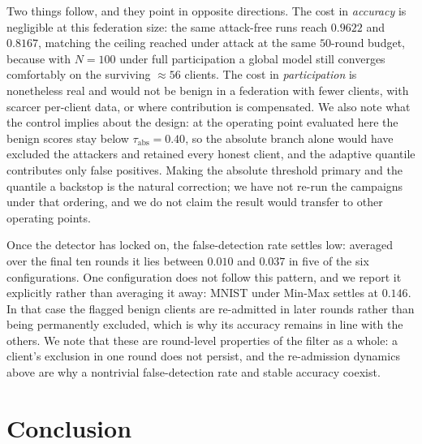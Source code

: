 \documentclass[journal]{IEEEtran}
\begin{document}
Two things follow, and they point in opposite directions. The cost in \emph{accuracy} is negligible at this federation size: the same attack-free runs reach $0.9622$ and $0.8167$, matching the ceiling reached under attack at the same $50$-round budget, because with $N = 100$ under full participation a global model still converges comfortably on the surviving $\approx56$ clients. The cost in \emph{participation} is nonetheless real and would not be benign in a federation with fewer clients, with scarcer per-client data, or where contribution is compensated. We also note what the control implies about the design: at the operating point evaluated here the benign scores stay below $\tau_{\mathrm{abs}} = 0.40$, so the absolute branch alone would have excluded the attackers and retained every honest client, and the adaptive quantile contributes only false positives. Making the absolute threshold primary and the quantile a backstop is the natural correction; we have not re-run the campaigns under that ordering, and we do not claim the result would transfer to other operating points.

Once the detector has locked on, the false-detection rate settles low: averaged over the final ten rounds it lies between $0.010$ and $0.037$ in five of the six configurations. One configuration does not follow this pattern, and we report it explicitly rather than averaging it away: MNIST under Min-Max settles at $0.146$. In that case the flagged benign clients are re-admitted in later rounds rather than being permanently excluded, which is why its accuracy remains in line with the others. We note that these are round-level properties of the filter as a whole: a client's exclusion in one round does not persist, and the re-admission dynamics above are why a nontrivial false-detection rate and stable accuracy coexist.

\section{Conclusion}
\label{sec:conclusion}
\end{document}

